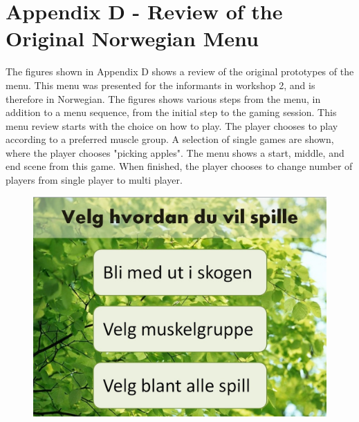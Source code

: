\newpage
\section*{Appendix D - Review of the Original Norwegian Menu}
\label{app:menureview}

The figures shown in Appendix D shows a review of the original prototypes of the menu. This menu was presented for the informants in workshop 2, and is therefore in Norwegian. The figures shows various steps from the menu, in addition to a menu sequence, from the initial step to the gaming session. This menu review starts with the choice on how to play. The player chooses to play according to a preferred muscle group. A selection of single games are shown, where the player chooses "picking apples". The menu shows a start, middle, and end scene from this game. When finished, the player chooses to change number of players from single player to multi player.  

\begin{figure} [H]
\centering
\includegraphics[scale=0.2]{menuStart.jpg}
\label{fig:menuStartNorsk}
\end{figure} 

